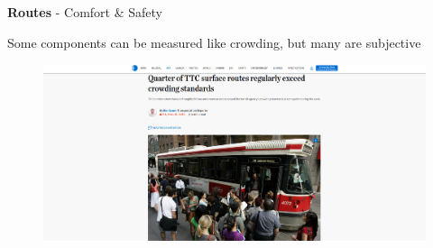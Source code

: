 \documentclass[aspectratio=169]{beamer}
\begin{document}
\begin{frame}
	
	\textbf{Routes} - Comfort \& Safety
	
	\vspace{2mm}
	
	Some components can be measured like crowding, but many are subjective 
	
	 \begin{figure}
	 	\centering
	 	\includegraphics[width=1\linewidth]{images/crowding.png}
	 \end{figure}
	
	
	
	
\end{frame}
\end{document}

